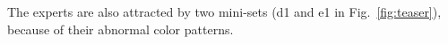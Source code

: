 \documentclass[format=acmsmall, review=false, screen=true]{acmart}
\begin{document}
The experts are also attracted by two mini-sets (d1 and e1 in Fig.~\ref{fig:teaser}), because of their abnormal color patterns.
\end{document}
